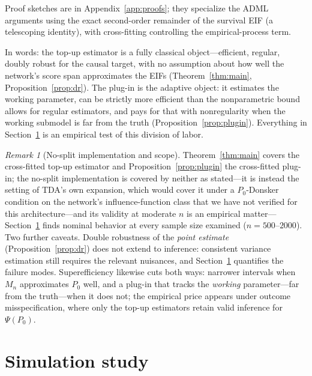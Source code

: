 \documentclass[11pt]{article}
\theoremstyle{remark}
\newtheorem{remark}{Remark}
\begin{document}
Proof sketches are in Appendix~\ref{app:proofs}; they specialize the ADML arguments using the exact second-order remainder of the survival EIF (a telescoping identity), with cross-fitting controlling the empirical-process term.

In words: the top-up estimator is a fully classical object---efficient, regular, doubly robust for the causal target, with no assumption about how well the network's score span approximates the EIFs (Theorem~\ref{thm:main}, Proposition~\ref{prop:dr}). The plug-in is the adaptive object: it estimates the working parameter, can be strictly more efficient than the nonparametric bound allows for regular estimators, and pays for that with nonregularity when the working submodel is far from the truth (Proposition~\ref{prop:plugin}). Everything in Section~\ref{sec:sims} is an empirical test of this division of labor.

\begin{remark}[No-split implementation and scope]\label{rem:honest}
Theorem~\ref{thm:main} covers the cross-fitted top-up estimator and Proposition~\ref{prop:plugin} the cross-fitted plug-in; the no-split implementation is covered by neither as stated---it is instead the setting of TDA's own expansion, which would cover it under a $P_0$-Donsker condition on the network's influence-function class that we have not verified for this architecture---and its validity at moderate $n$ is an empirical matter---Section~\ref{sec:sims} finds nominal behavior at every sample size examined ($n=500$--$2000$). Two further caveats. Double robustness of the \emph{point estimate} (Proposition~\ref{prop:dr}) does not extend to inference: consistent variance estimation still requires the relevant nuisances, and Section~\ref{sec:sims} quantifies the failure modes. Superefficiency likewise cuts both ways: narrower intervals when $M_n$ approximates $P_0$ well, and a plug-in that tracks the \emph{working} parameter---far from the truth---when it does not; the empirical price appears under outcome misspecification, where only the top-up estimators retain valid inference for $\Psi(P_0)$.
\end{remark}

\section{Simulation study}\label{sec:sims}
\end{document}
